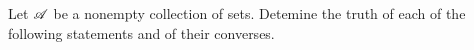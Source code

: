\documentclass[../main.tex]{subfiles}
\begin{document}
\problem{}\label{s1p5}
Let \(\mathscr{A}\) be a nonempty collection of sets. Detemine the truth of each
of the following statements and of their converses.





\end{document}
